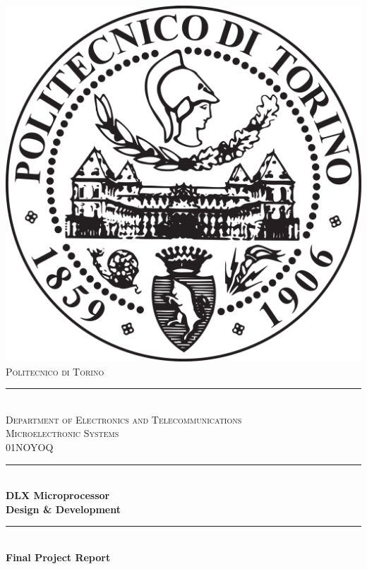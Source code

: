 \begin{titlepage}
	\centering
	\vspace*{0.5 cm}
	\includegraphics[scale = 0.1]{polito_logo.pdf} \\ [1 cm]				    %
	\textsc{\LARGE Politecnico di Torino} \\ [-0.2 cm]					        %
	\rule{\linewidth}{0.2 mm} \\
	\textsc{\large Department of Electronics and Telecommunications}\\[1 cm]	%
	\textsc{\large Microelectronic Systems} \\ [0 cm]				            %
	\textsc{01NOYOQ}\\[0.4 cm]								                    %
	\rule{\linewidth}{0.2 mm} \\ [0.4 cm]
	{ \Huge \bfseries DLX Microprocessor} \\[0.2 cm]
        { \huge \bfseries Design \& Development} \\
	\rule{\linewidth}{0.2 mm} \\ [1 cm]

        { \Large \bfseries Final Project Report} \\ [1 cm]


\end{titlepage}
